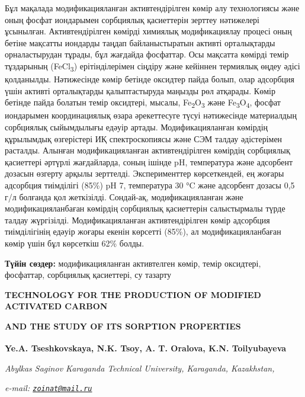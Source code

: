 Бұл мақалада модификацияланған активтендірілген көмір алу технологиясы
және оның фосфат иондарымен сорбциялық қасиеттерін зерттеу нәтижелері
ұсынылған. Активтендірілген көмірді химиялық модификациялау процесі оның
бетіне мақсатты иондарды таңдап байланыстыратын активті орталықтарды
орналастырудан тұрады, бұл жағдайда фосфаттар. Осы мақсатта көмірді
темір тұздарының (FeCl\textsubscript{3}) ерітінділерімен сіңдіру және
кейіннен термиялық өңдеу әдісі қолданылды. Нәтижесінде көмір бетінде
оксидтер пайда болып, олар адсорбция үшін активті орталықтарды
қалыптастыруда маңызды рөл атқарады. Көмір бетінде пайда болатын темір
оксидтері, мысалы, Fe\textsubscript{2}O\textsubscript{3} және
Fe\textsubscript{3}O\textsubscript{4}, фосфат иондарымен координациялық
өзара әрекеттесуге түсуі нәтижесінде материалдың сорбциялық сыйымдылығы
едәуір артады. Модификацияланған көмірдің құрылымдық өзгерістері ИҚ
спектроскопиясы және СЭМ талдау әдістерімен расталды. Алынған
модификацияланған активтендірілген көмірдің сорбциялық қасиеттері
әртүрлі жағдайларда, соның ішінде pH, температура және адсорбент дозасын
өзгерту арқылы зерттелді. Эксперименттер көрсеткендей, ең жоғары
адсорбция тиімділігі (85\%) pH 7, температура 30 °C және адсорбент
дозасы 0,5 г/л болғанда қол жеткізілді. Сондай-ақ, модификацияланған
және модификацияланбаған көмірдің сорбциялық қасиеттерін салыстырмалы
түрде талдау жүргізілді. Модификацияланған активтендірілген көмір
адсорбция тиімділігінің едәуір жоғары екенін көрсетті (85\%), ал
модификацияланбаған көмір үшін бұл көрсеткіш 62\% болды.

{\bfseries Түйін сөздер:} модификацияланған активтелген көмір, темір
оксидтері, фосфаттар, сорбциялық қасиеттері, су тазарту

{\bfseries TECHNOLOGY FOR THE PRODUCTION OF MODIFIED ACTIVATED CARBON}

{\bfseries AND THE STUDY OF ITS SORPTION PROPERTIES}

{\bfseries Ye.A. Tseshkovskaya, N.K. Tsoy\textsuperscript{\envelope }, A. T.
Oralova, K.N. Toilyubayeva}

\emph{Abylkas Saginov Karaganda Technical University, Karaganda,
Kazakhstan,}

\emph{e-mail: \href{mailto:zoinat@mail.ru}{\nolinkurl{zoinat@mail.ru}}}


